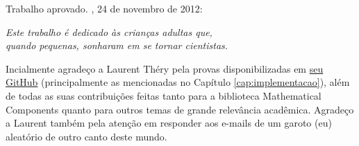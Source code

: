 \begin{folhadeaprovacao}
	\begin{center}
	  {\ABNTEXchapterfont\large\imprimirautor}
	  \vspace*{\fill}\vspace*{\fill}
	  \begin{center}
		\ABNTEXchapterfont\bfseries\Large\imprimirtitulo
	  \end{center}
	  \vspace*{\fill}
	  \hspace{.45\textwidth}
	  \begin{minipage}{.5\textwidth}
		  \imprimirpreambulo
	  \end{minipage}%
	  \vspace*{\fill}
	 \end{center}
		  
	 Trabalho aprovado. \imprimirlocal, 24 de novembro de 2012:
  
		
	 \begin{center}
	  \vspace*{0.5cm}
	  {\large\imprimirlocal}
	  \par
	  {\large\imprimirdata}
	  \vspace*{1cm}
	\end{center}
	
\end{folhadeaprovacao}

\begin{dedicatoria}
	\vspace*{\fill}
	\centering
	\noindent
	\textit{ Este trabalho é dedicado às crianças adultas que,\\
	quando pequenas, sonharam em se tornar cientistas.} \vspace*{\fill}
\end{dedicatoria}

\begin{agradecimentos}
	Incialmente agradeço a Laurent Théry pela provas disponibilizadas em \hyperlink{https://github.com/thery/mathcomp-extra/blob/master/euler.v}{seu GitHub} (principalmente as mencionadas no Capítulo \ref{cap:implementacao}), além de todas as suas contribuições feitas tanto para a biblioteca Mathematical Components quanto para outros temas de grande relevância acadêmica. Agradeço a Laurent também pela atenção em responder aos e-mails de um garoto (eu) aleatório de outro canto deste mundo. 
\end{agradecimentos}

